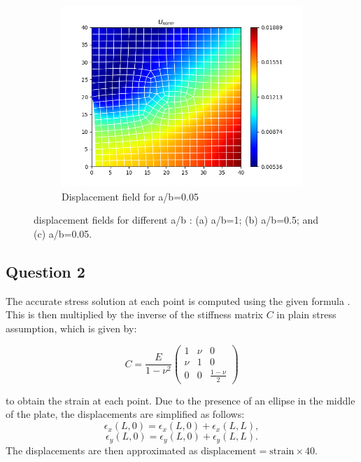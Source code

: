 \documentclass[twoside,twocolumn,10pt]{article}
\begin{document}
\begin{figure}[!ht]
\begin{subfigure}[c]{0.32\textwidth}
    \centering
    \includegraphics[width=1.\linewidth]{Q2_1/Q1_0.05_2_quad.png}
    \caption{Displacement field for a/b=0.05}
    \label{fig:disp_005}
  \end{subfigure}
  \caption{ displacement fields for different a/b : (a) a/b=1; (b) a/b=0.5; and (c) a/b=0.05.}
  \label{fig:disp}  
\end{figure} 

\subsection{Question 2}

The accurate stress solution at each point is computed using the given formula \cite{jin2014solution}. This is then multiplied by the inverse of the stiffness matrix \(C\) in plain stress assumption, which is given by:

\begin{equation}
C = \frac{E}{1 - \nu^2} \begin{pmatrix}
    1 & \nu & 0 \\
    \nu & 1 & 0 \\
    0 & 0 & \frac{1-\nu}{2}
\end{pmatrix}
\end{equation}

to obtain the strain at each point. Due to the presence of an ellipse in the middle of the plate, the displacements are simplified as follows:
\[
\epsilon_x(L,0) = \epsilon_x(L,0) + \epsilon_x(L,L),
\]
\[
\epsilon_y(L,0) = \epsilon_y(L,0) + \epsilon_y(L,L).
\]
The displacements are then approximated as \(\text{displacement} = \text{strain} \times 40\).
\end{document}
